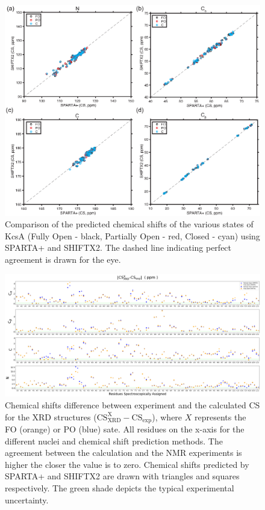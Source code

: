 \documentclass[%
 aip,
 amsmath,amssymb,
 preprint,%
]{revtex4-1}
\begin{document}
\begin{figure}[tbp]
	\includegraphics[width=\textwidth]{figures_SI/SHIFTX2_SPARTA-01.eps}
	 \caption{\scriptsize
	 Comparison of the predicted chemical shifts of the various states of KcsA (Fully Open - black, Partially Open - red, Closed - cyan) using SPARTA+ and SHIFTX2. The dashed line indicating perfect agreement is drawn for the eye.
}
\label{SI_SPARTA_v_SHIFTX2}
\end{figure}

\begin{figure}
	\includegraphics[width=\textwidth]{figures_SI/assignment_skew_model_all_print_no_ref_XRD.png}
 	 \caption{\scriptsize
    Chemical shifts difference between experiment and the calculated CS for the XRD structures ($\text{CS}_{\text{XRD}}^{\text{X}}-\text{CS}_{\text{exp}}$), where $X$ represents the FO (orange) or PO (blue) sate. All residues on the x-axis for the different nuclei and chemical shift prediction methods. The agreement between the calculation and the NMR experiments is higher the closer the value is to zero. Chemical shifts predicted by SPARTA+ and SHIFTX2 are drawn with triangles and squares respectively. The green shade depicts the typical experimental uncertainty.}
\label{SI_assignment_XRD}
\end{figure}
\end{document}
